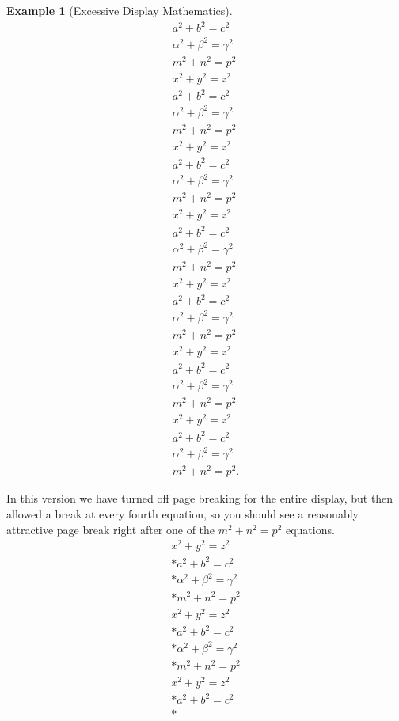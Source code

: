 \documentclass[10pt,]{article}
\theoremstyle{plain}
\theoremstyle{definition}
\theoremstyle{definition}
\theoremstyle{definition}
\theoremstyle{definition}
\newtheorem{example}[theorem]{Example}
\theoremstyle{definition}
\theoremstyle{definition}
\numberwithin{equation}{section}
\begin{document}
\begin{example}[Excessive Display Mathematics]
\begin{gather*}
a^2+b^2=c^2\\
\alpha^2+\beta^2=\gamma^2\\
m^2+n^2=p^2\\
x^2+y^2=z^2\\
a^2+b^2=c^2\\
\alpha^2+\beta^2=\gamma^2\\
m^2+n^2=p^2\\
x^2+y^2=z^2\\
a^2+b^2=c^2\\
\alpha^2+\beta^2=\gamma^2\\
m^2+n^2=p^2\\
x^2+y^2=z^2\\
a^2+b^2=c^2\\
\alpha^2+\beta^2=\gamma^2\\
m^2+n^2=p^2\\
x^2+y^2=z^2\\
a^2+b^2=c^2\\
\alpha^2+\beta^2=\gamma^2\\
m^2+n^2=p^2\\
x^2+y^2=z^2\\
a^2+b^2=c^2\\
\alpha^2+\beta^2=\gamma^2\\
m^2+n^2=p^2\\
x^2+y^2=z^2\\
a^2+b^2=c^2\\
\alpha^2+\beta^2=\gamma^2\\
m^2+n^2=p^2\text{.}
\end{gather*}
%
\par
\hypertarget{p-187}{}%
In this version we have turned off page breaking for the entire display, but then allowed a break at every fourth equation, so you should see a reasonably attractive page break right after one of the \(m^2+n^2=p^2\) equations.%
\begin{gather}
x^2+y^2=z^2\label{mrow-86}\\*
a^2+b^2=c^2\label{mrow-87}\\*
\alpha^2+\beta^2=\gamma^2\label{mrow-88}\\*
m^2+n^2=p^2\label{mrow-89}\\
x^2+y^2=z^2\label{mrow-90}\\*
a^2+b^2=c^2\label{mrow-91}\\*
\alpha^2+\beta^2=\gamma^2\label{mrow-92}\\*
m^2+n^2=p^2\label{mrow-93}\\
x^2+y^2=z^2\label{mrow-94}\\*
a^2+b^2=c^2\label{mrow-95}\\*

\end{gather}
\end{example}
\end{document}
